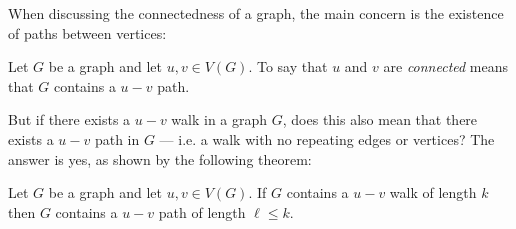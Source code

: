 When discussing the connectedness of a graph, the main concern is the existence of paths between vertices:

\begin{definition}
  Let \(G\) be a graph and let \(u,v\in V(G)\).  To say that \(u\) and \(v\) are \emph{connected} means that \(G\)
  contains a \(u-v\) path.
\end{definition}

But if there exists a \(u-v\) walk in a graph \(G\), does this also mean that there exists a \(u-v\) path in \(G\)
--- i.e. a walk with no repeating edges or vertices?  The answer is yes, as shown by the following theorem:

\begin{theorem}
  Let \(G\) be a graph and let \(u,v\in V(G)\).  If \(G\) contains a \(u-v\) walk of length \(k\) then \(G\)
  contains a \(u-v\) path of length \(\ell\le k\).
\end{theorem}

